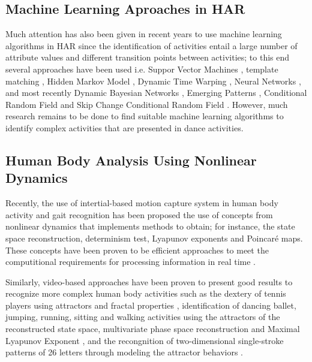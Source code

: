 \documentclass{sigchi}
\begin{document}
\subsection{Machine Learning Aproaches in HAR}
Much attention has also been given in recent years to use machine learning 
algorithms in HAR since the identification of activities entail a large number of 
attribute values and different transition points between activities;
to this end several approaches have been used i.e. 
Suppor Vector Machines \cite{J.FrankS.Mannor2010, Sama2013, Schuldt2004},
template matching \cite{Nguyen2009,Lin2007}, 
Hidden Markov Model 
\cite{Kohn2012,Niu2004,Chen2003,Bernardin2003,Eickeler1998,Chang2000},
Dynamic Time Warping \cite{Bautista2013,Boulgouris2004,Celebi2011},
Neural Networks \cite{Rosenblum1994,Ji2013,Modi2011,Boesnach2004},
and  most recently Dynamic Bayesian Networks \cite{Cuaya2013, Wang2014}, 
Emerging Patterns \cite{Tao2009, Kim2010},
Conditional Random Field  \cite{Wang2006} and
Skip Change Conditional Random Field \cite{Kim2010}. 
However, much research remains to be done to find suitable machine learning 
algorithms to identify complex activities that are presented in dance activities.


\subsection{Human Body Analysis Using Nonlinear Dynamics}

Recently, the use of intertial-based motion capture system in human body activity 
and gait recognition has been proposed the use of concepts from nonlinear dynamics 
that implements methods to obtain; for instance, the state space reconstruction,
determinism test, Lyapunov exponents and Poincar\'e maps.
These concepts have been proven to be efficient approaches to meet the computitional 
requirements for processing information in real time
\cite{J.FrankS.Mannor2010, Sama2013, Gouwanda2012,Perc2005, Akiduki2013,Akiduki2014}. 

Similarly, video-based approaches have been proven to present good results 
to recognize more complex human body activities such as the dextery of tennis players 
using attractors and fractal properties \cite{Yamamoto2000,Suzuki2013} 
, identification of dancing ballet, jumping, running, sitting and walking activities
using the attractors of the reconstructed state space, 
multivariate phase space reconstruction
and Maximal Lyapunov Exponent 
\cite{Ali2007,Basharat2009,Venkataraman2013}, and the recongnition of 
two-dimensional single-stroke patterns of 26 letters 
through modeling the attractor behaviors \cite{Ijspeert2013}. 
\end{document}
